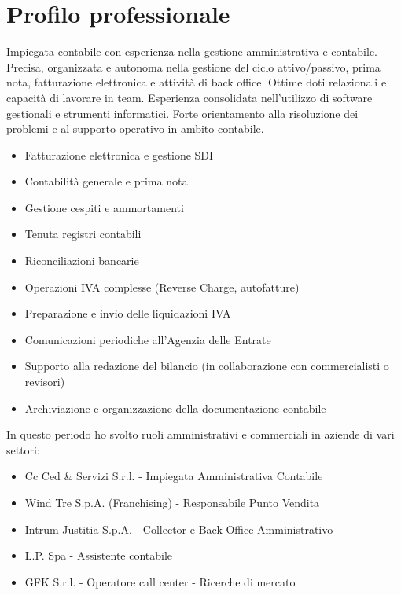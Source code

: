 \documentclass{resume}
\begin{document}



\section{\textbf{Profilo professionale}}
Impiegata contabile con esperienza nella gestione amministrativa e contabile. Precisa,
organizzata e autonoma nella gestione del ciclo attivo/passivo, prima nota, fatturazione elettronica e attività di
back office. Ottime doti relazionali e capacità di lavorare in team. Esperienza consolidata nell'utilizzo di
software gestionali e strumenti informatici. Forte orientamento alla risoluzione dei problemi e al supporto
operativo in ambito contabile.

\begin{itemize}
  \item Fatturazione elettronica e gestione SDI
  \item Contabilità generale e prima nota
  \item Gestione cespiti e ammortamenti
  \item Tenuta registri contabili
  \item Riconciliazioni bancarie
  \item Operazioni IVA complesse (Reverse Charge, autofatture)
  \item Preparazione e invio delle liquidazioni IVA
  \item Comunicazioni periodiche all'Agenzia delle Entrate
  \item Supporto alla redazione del bilancio (in collaborazione con commercialisti o revisori)
  \item Archiviazione e organizzazione della documentazione contabile
\end{itemize}

In questo periodo ho svolto ruoli amministrativi e commerciali in aziende di vari settori:
\begin{itemize}
  \item Cc Ced \& Servizi S.r.l. - Impiegata Amministrativa Contabile
  \item Wind Tre S.p.A. (Franchising) - Responsabile Punto Vendita
  \item Intrum Justitia S.p.A. - Collector e Back Office Amministrativo
  \item L.P. Spa - Assistente contabile
  \item GFK S.r.l. - Operatore call center - Ricerche di mercato
\end{itemize}
\end{document}
